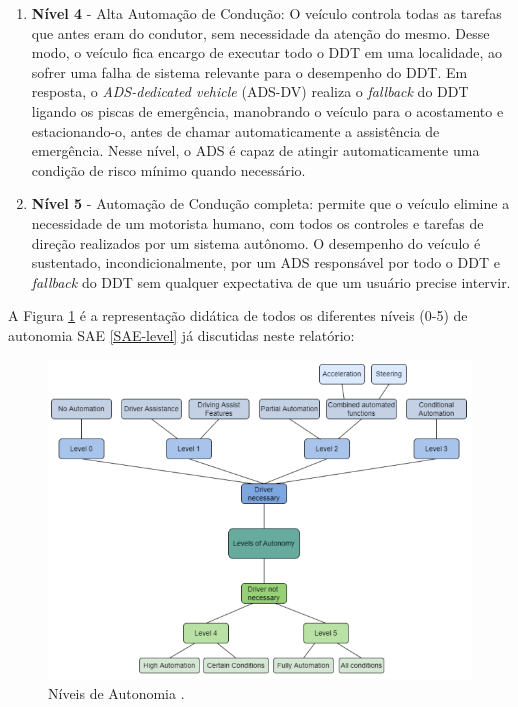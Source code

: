 \begin{enumerate}
\item \textbf{Nível 4} - Alta Automação de Condução: O veículo controla todas as tarefas 
que antes eram do condutor, sem necessidade da atenção do mesmo. Desse modo, o veículo fica encargo de executar todo o DDT em uma localidade, ao sofrer uma falha de sistema relevante para o desempenho do DDT. Em resposta, o \textit{ADS-dedicated vehicle} (ADS-DV) realiza o \textit{fallback} do DDT ligando os piscas de emergência, manobrando o veículo para o acostamento e estacionando-o, antes de chamar automaticamente a assistência de emergência. Nesse  nível, o ADS é capaz de atingir automaticamente uma condição de risco mínimo quando necessário.

\item \textbf{Nível 5} - Automação de Condução completa: permite que o veículo elimine a necessidade de um motorista humano, com todos os controles e tarefas de direção realizados por um sistema autônomo. O desempenho do veículo é sustentado, incondicionalmente, por um ADS responsável por todo o DDT e \textit{fallback} do DDT sem qualquer expectativa de que um usuário precise intervir.

\end{enumerate}

A Figura \ref{niveis-auto} é a representação didática de todos os diferentes níveis (0-5) de autonomia SAE \ref{SAE-level} já discutidas neste relatório:

\begin{figure}[H]
\centering
\includegraphics[width=\textwidth]{Figures/level-auto.png}
\caption{Níveis de Autonomia \cite{review-auto}.}
\label{niveis-auto}
\end{figure}

